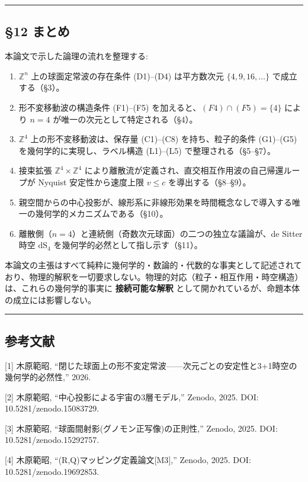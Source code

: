 \documentclass[
  a4paper,11pt]{ltjsarticle}
\providecommand{\tightlist}{%
  \setlength{\itemsep}{0pt}\setlength{\parskip}{0pt}}
\theoremstyle{definition}
\theoremstyle{remark}
\begin{document}
\begin{center}\rule{0.5\linewidth}{0.5pt}\end{center}

\subsection{§12 まとめ}\label{ux307eux3068ux3081}

本論文で示した論理の流れを整理する:

\begin{enumerate}
\def\labelenumi{\arabic{enumi}.}
\tightlist
\item
  \(\mathbb{Z}^n\) 上の球面定常波の存在条件 (D1)--(D4) は平方数次元
  \(\{4, 9, 16, \ldots\}\) で成立する（§3）。
\item
  形不変移動波の構造条件 (F1)--(F5)
  を加えると、\((F4) \cap (F5) = \{4\}\) により \(n = 4\)
  が唯一の次元として特定される（§4）。
\item
  \(\mathbb{Z}^4\) 上の形不変移動波は、保存量 (C1)--(C8)
  を持ち、粒子的条件 (G1)--(G5) を幾何学的に実現し、ラベル構造
  (L1)--(L5) で整理される（§5--§7）。
\item
  接束拡張 \(\mathbb{Z}^4 \times \mathbb{Z}^4\)
  により離散流が定義され、直交相互作用波の自己帰還ループが Nyquist
  安定性から速度上限 \(v \leq c\) を導出する（§8--§9）。
\item
  親空間からの中心投影が、線形系に非線形効果を時間概念なしで導入する唯一の幾何学的メカニズムである（§10）。
\item
  離散側（\(n = 4\)）と連続側（奇数次元球面）の二つの独立な議論が、de
  Sitter 時空 \(\mathrm{dS}_4\) を幾何学的必然として指し示す（§11）。
\end{enumerate}

本論文の主張はすべて純粋に幾何学的・数論的・代数的な事実として記述されており、物理的解釈を一切要求しない。物理的対応（粒子・相互作用・時空構造）は、これらの幾何学的事実に
\textbf{接続可能な解釈}
として開かれているが、命題本体の成立には影響しない。

\begin{center}\rule{0.5\linewidth}{0.5pt}\end{center}

\subsection{参考文献}\label{ux53c2ux8003ux6587ux732e}

{[}1{]} 木原範昭,
``閉じた球面上の形不変定常波------次元ごとの安定性と3+1時空の幾何学的必然性,''
2026.

{[}2{]} 木原範昭, ``中心投影による宇宙の3層モデル,'' Zenodo, 2025. DOI:
10.5281/zenodo.15083729.

{[}3{]} 木原範昭, ``球面間射影(グノモン正写像)の正則性,'' Zenodo, 2025.
DOI: 10.5281/zenodo.15292757.

{[}4{]} 木原範昭, ``(R,Q)マッピング定義論文{[}M3{]},'' Zenodo, 2025.
DOI: 10.5281/zenodo.19692853.
\end{document}
